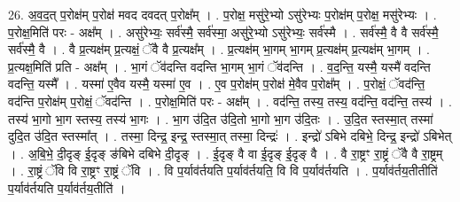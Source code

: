 \documentclass[17pt]{extarticle}
\begin{document}
26. अ॒व॒द॒त् प॒रोक्ष॑म् प॒रोक्ष॑ मवद दवदत् प॒रोक्ष᳚म् । . प॒रोक्ष॒ मसु॑रे॒भ्यो ऽसु॑रेभ्यः प॒रोक्ष॑म् प॒रोक्ष॒ मसु॑रेभ्यः । . प॒रोक्ष॒मिति॑ परः - अक्ष᳚म् । . असु॑रेभ्यः॒ सर्व॑स्मै॒ सर्व॑स्मा॒ असु॑रे॒भ्यो ऽसु॑रेभ्यः॒ सर्व॑स्मै । . सर्व॑स्मै॒ वै वै सर्व॑स्मै॒ सर्व॑स्मै॒ वै । . वै प्र॒त्यक्ष॑म् प्र॒त्यक्षं॒ ॅवै वै प्र॒त्यक्ष᳚म् । . प्र॒त्यक्ष॑म् भा॒गम् भा॒गम् प्र॒त्यक्ष॑म् प्र॒त्यक्ष॑म् भा॒गम् । . प्र॒त्यक्ष॒मिति॑ प्रति - अक्ष᳚म् । . भा॒गं ॅव॑दन्ति वदन्ति भा॒गम् भा॒गं ॅव॑दन्ति । . व॒द॒न्ति॒ यस्मै॒ यस्मै॑ वदन्ति वदन्ति॒ यस्मै᳚ । . यस्मा॑ ए॒वैव यस्मै॒ यस्मा॑ ए॒व । . ए॒व प॒रोक्ष॑म् प॒रोक्ष॑ मे॒वैव प॒रोक्ष᳚म् । . प॒रोक्षं॒ ॅवद॑न्ति॒ वद॑न्ति प॒रोक्ष॑म् प॒रोक्षं॒ ॅवद॑न्ति । . प॒रोक्ष॒मिति॑ परः - अक्ष᳚म् । . वद॑न्ति॒ तस्य॒ तस्य॒ वद॑न्ति॒ वद॑न्ति॒ तस्य॑ । . तस्य॑ भा॒गो भा॒ग स्तस्य॒ तस्य॑ भा॒गः । . भा॒ग उ॑दि॒त उ॑दि॒तो भा॒गो भा॒ग उ॑दि॒तः । . उ॒दि॒त स्तस्मा॒त् तस्मा॑ दुदि॒त उ॑दि॒त स्तस्मा᳚त् । . तस्मा॒ दिन्द्र॒ इन्द्र॒ स्तस्मा॒त् तस्मा॒ दिन्द्रः॑ । . इन्द्रो॑ ऽबिभे दबिभे॒ दिन्द्र॒ इन्द्रो॑ ऽबिभेत् । . अ॒बि॒भे॒ दी॒दृङ् ई॒दृङ् ङ॑बिभे दबिभे दी॒दृङ् । . ई॒दृङ् वै वा ई॒दृङ् ई॒दृङ् वै । . वै रा॒ष्ट्रꣳ रा॒ष्ट्रं ॅवै वै रा॒ष्ट्रम् । . रा॒ष्ट्रं ॅवि वि रा॒ष्ट्रꣳ रा॒ष्ट्रं ॅवि । . वि प॒र्याव॑र्तयति प॒र्याव॑र्तयति॒ वि वि प॒र्याव॑र्तयति । . प॒र्याव॑र्तय॒तीतीति॑ प॒र्याव॑र्तयति प॒र्याव॑र्तय॒तीति॑ । \newline
\end{document}
